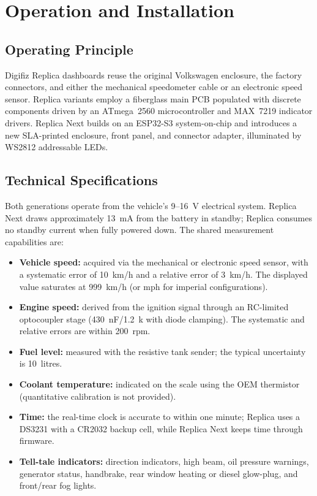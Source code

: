 \chapter{Operation and Installation} \label{ch:Usage}

\section{Operating Principle}

Digifiz Replica dashboards reuse the original Volkswagen enclosure, the factory connectors, and either the mechanical speedometer cable or an electronic speed sensor.
Replica variants employ a fiberglass main PCB populated with discrete components driven by an ATmega~2560 microcontroller and MAX~7219 indicator drivers.
Replica Next builds on an ESP32-S3 system-on-chip and introduces a new SLA-printed enclosure, front panel, and connector adapter, illuminated by WS2812 addressable LEDs.

\section{Technical Specifications}

Both generations operate from the vehicle's 9--16~V electrical system.
Replica Next draws approximately 13~mA from the battery in standby; Replica consumes no standby current when fully powered down.
The shared measurement capabilities are:
\begin{itemize}
    \item \textbf{Vehicle speed:} acquired via the mechanical or electronic speed sensor, with a systematic error of 10~km/h and a relative error of 3~km/h.
          The displayed value saturates at 999~km/h (or mph for imperial configurations).
    \item \textbf{Engine speed:} derived from the ignition signal through an RC-limited optocoupler stage (430~nF/1.2~k\ohm{} with diode clamping).
          The systematic and relative errors are within 200~rpm.
    \item \textbf{Fuel level:} measured with the resistive tank sender; the typical uncertainty is 10~litres.
    \item \textbf{Coolant temperature:} indicated on the scale using the OEM thermistor (quantitative calibration is not provided).
    \item \textbf{Time:} the real-time clock is accurate to within one minute; Replica uses a DS3231 with a CR2032 backup cell, while Replica Next keeps time through firmware.
    \item \textbf{Tell-tale indicators:} direction indicators, high beam, oil pressure warnings, generator status, handbrake, rear window heating or diesel glow-plug, and front/rear fog lights.
\end{itemize}

